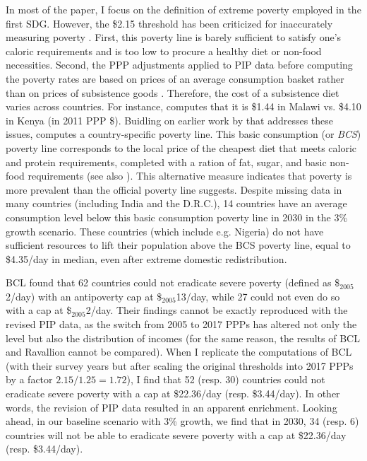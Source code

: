 \documentclass[12pt,english]{article}
\begin{document}
In most of the paper, I focus on the definition of extreme poverty employed in the first SDG. However, the \$2.15 threshold has been criticized for inaccurately measuring poverty \citep{woodward_redefining_2010,deaton_price_2010,deaton_purchasing_2011}. %
First, this poverty line %
is barely sufficient to satisfy one's caloric requirements and is too low to procure a healthy diet or non-food necessities. 
Second, the PPP adjustments applied to PIP data before computing the poverty rates are based on prices of an average consumption basket rather than on prices of subsistence goods \citep{sullivan_capitalist_2023}. Therefore, the cost of a subsistence diet varies across countries. For instance, \cite{moatsos_global_2016} computes that it is \$1.44 in Malawi vs. \$4.10 in Kenya (in 2011 PPP \$). Buidling on earlier work by \cite{allen_absolute_2017} that addresses these issues, \cite{moatsos_global_2016} computes a country-specific poverty line. This basic consumption (or \textit{BCS}) poverty line corresponds to the local price of the cheapest diet that meets caloric and protein requirements, completed with a ration of fat, sugar, and basic non-food requirements (see also \citealp{moatsos_global_2021}). This alternative measure indicates that poverty %
is more prevalent than the official poverty line suggests. Despite missing data in many countries (including India and the D.R.C.), 14 countries have an average consumption level below this basic consumption poverty line in 2030 in the 3\% growth scenario. These countries (which include e.g. Nigeria) do not have sufficient resources to lift their population above the BCS poverty line, equal to \$4.35/day in median, even after extreme domestic redistribution. 

BCL found that 62 countries could not eradicate severe poverty (defined as \$$_\text{2005}$2/day) with an antipoverty cap at \$$_\text{2005}$13/day, while 27 could not even do so with a cap at \$$_\text{2005}$2/day. 
Their findings cannot be exactly reproduced with the revised PIP data, as the switch from 2005 to 2017 PPPs has altered not only the level but also the distribution of incomes (for the same reason, the results of BCL and Ravallion cannot be compared). 
When I replicate the computations of BCL (with their survey years but after scaling the original thresholds into 2017 PPPs by a factor $2.15/1.25 = 1.72$), I find that 52 (resp. 30) 
countries could not eradicate severe poverty with a cap at \$22.36/day (resp. \$3.44/day). 
In other words, the revision of PIP data resulted in an apparent enrichment. 
Looking ahead, in our baseline scenario with 3\% growth, we find that in 2030, 34 (resp. 6) 
countries will not be able to eradicate severe poverty with a cap at \$22.36/day (resp. \$3.44/day).
\end{document}
